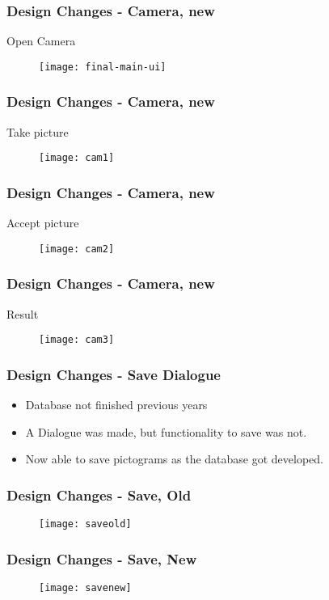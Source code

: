 \begin{frame}
	\frametitle{Design Changes - Camera, new}
	Open Camera
		\begin{figure}
		\centering
			\texttt{[image: final-main-ui]}
		\end{figure}
\end{frame}

\begin{frame}
	\frametitle{Design Changes - Camera, new}
	Take picture
		\begin{figure}
		\centering
			\texttt{[image: cam1]}
		\end{figure}
\end{frame}

\begin{frame}
	\frametitle{Design Changes - Camera, new}
	Accept picture
		\begin{figure}
		\centering
			\texttt{[image: cam2]}
		\end{figure}
\end{frame}

\begin{frame}
	\frametitle{Design Changes - Camera, new}
	Result
		\begin{figure}
		\centering
			\texttt{[image: cam3]}
		\end{figure}
\end{frame}
\begin{frame}
	\frametitle{Design Changes - Save Dialogue}
	\begin{itemize}
	\item Database not finished previous years
	\item A Dialogue was made, but functionality to save was not.
	\item Now able to save pictograms as the database got developed.
	\end{itemize}
\end{frame}

\begin{frame}
	\frametitle{Design Changes - Save, Old}
		\begin{figure}
		\centering
			\texttt{[image: saveold]}
		\end{figure}
\end{frame}

\begin{frame}
	\frametitle{Design Changes - Save, New}
		\begin{figure}
		\centering
			\texttt{[image: savenew]}
		\end{figure}
\end{frame}